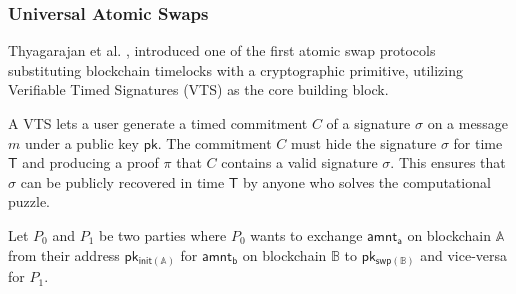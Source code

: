 \documentclass{article}      	%
\begin{document}
%

\subsubsection{Universal Atomic Swaps}


Thyagarajan et al. \cite{uas}, introduced one of the first atomic swap protocols substituting blockchain timelocks with a cryptographic primitive, utilizing Verifiable Timed Signatures (VTS) \cite{vts} as the core building block.

A VTS lets a user generate a timed commitment $C$ of a signature $\sigma$ on a message $m$ under a public key $\mathsf{pk}$. The commitment $C $ must hide the signature $\sigma$ for time $\mathsf{T}$ and producing a proof $\pi$ that $C$ contains a valid signature $\sigma$. This ensures that $\sigma$ can be publicly recovered in time $\mathsf{T}$ by anyone who solves the computational puzzle.

Let $P_0$ and $P_1$ be two parties where $P_0$ wants to exchange $\mathsf{amnt_a}$ on blockchain $\mathbb{A}$ from their address $\mathsf{pk_{init(\mathbb{A})}}$ for $\mathsf{amnt_b}$ on blockchain $\mathbb{B}$ to $\mathsf{pk_{swp(\mathbb{B})}}$ and vice-versa for $P_1$.
\end{document}
